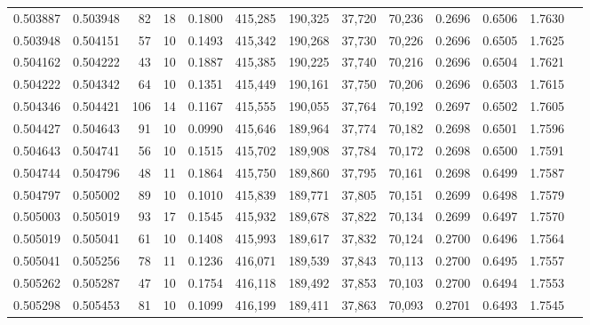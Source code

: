 \begin{tabular}{rrrrrrrrrrrrr}
0.503887 & 0.503948 &    82 &  18 &                                     0.1800 & 415,285 & 190,325 &  37,720 &  70,236 & 0.2696 & 0.6506 & 1.7630 \\
0.503948 & 0.504151 &    57 &  10 &                                     0.1493 & 415,342 & 190,268 &  37,730 &  70,226 & 0.2696 & 0.6505 & 1.7625 \\
0.504162 & 0.504222 &    43 &  10 &                                     0.1887 & 415,385 & 190,225 &  37,740 &  70,216 & 0.2696 & 0.6504 & 1.7621 \\
0.504222 & 0.504342 &    64 &  10 &                                     0.1351 & 415,449 & 190,161 &  37,750 &  70,206 & 0.2696 & 0.6503 & 1.7615 \\
0.504346 & 0.504421 &   106 &  14 &                                     0.1167 & 415,555 & 190,055 &  37,764 &  70,192 & 0.2697 & 0.6502 & 1.7605 \\
0.504427 & 0.504643 &    91 &  10 &                                     0.0990 & 415,646 & 189,964 &  37,774 &  70,182 & 0.2698 & 0.6501 & 1.7596 \\
0.504643 & 0.504741 &    56 &  10 &                                     0.1515 & 415,702 & 189,908 &  37,784 &  70,172 & 0.2698 & 0.6500 & 1.7591 \\
0.504744 & 0.504796 &    48 &  11 &                                     0.1864 & 415,750 & 189,860 &  37,795 &  70,161 & 0.2698 & 0.6499 & 1.7587 \\
0.504797 & 0.505002 &    89 &  10 &                                     0.1010 & 415,839 & 189,771 &  37,805 &  70,151 & 0.2699 & 0.6498 & 1.7579 \\
0.505003 & 0.505019 &    93 &  17 &                                     0.1545 & 415,932 & 189,678 &  37,822 &  70,134 & 0.2699 & 0.6497 & 1.7570 \\
0.505019 & 0.505041 &    61 &  10 &                                     0.1408 & 415,993 & 189,617 &  37,832 &  70,124 & 0.2700 & 0.6496 & 1.7564 \\
0.505041 & 0.505256 &    78 &  11 &                                     0.1236 & 416,071 & 189,539 &  37,843 &  70,113 & 0.2700 & 0.6495 & 1.7557 \\
0.505262 & 0.505287 &    47 &  10 &                                     0.1754 & 416,118 & 189,492 &  37,853 &  70,103 & 0.2700 & 0.6494 & 1.7553 \\
0.505298 & 0.505453 &    81 &  10 &                                     0.1099 & 416,199 & 189,411 &  37,863 &  70,093 & 0.2701 & 0.6493 & 1.7545 \\

\end{tabular}
